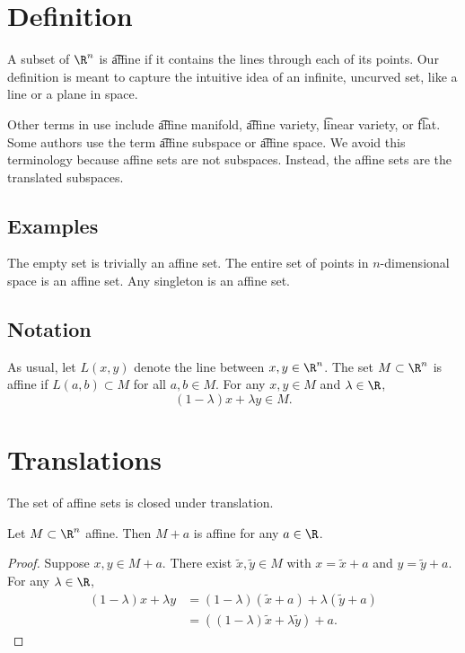
\section*{Definition}

A subset of $\R ^n$ is \t{affine} if it contains the lines through each of its points.
Our definition is meant to capture the intuitive idea of an infinite, uncurved set, like a line or a plane in space.

Other terms in use include \t{affine manifold}, \t{affine variety}, \t{linear variety}, or \t{flat}.
Some authors use the term \t{affine subspace} or \t{affine space}.
We avoid this terminology because affine sets are not subspaces.
Instead, the affine sets are the translated subspaces.

\subsection*{Examples}

The empty set is trivially an affine set.
The entire set of points in $n$-dimensional space is an affine set.
Any singleton is an affine set.

\subsection*{Notation}

As usual, let $L(x, y)$ denote the line between $x, y \in \R ^n$.
The set $M \subset \R ^n$ is affine if $L(a, b) \subset M$ for all $a, b \in M$.
For any $x, y \in M$ and $\lambda  \in \R $,
\[
(1-\lambda )x + \lambda y \in M.
\]

\section*{Translations}

The set of affine sets is closed under translation.
\begin{proposition}
Let $M \subset \R ^n$ affine.
Then $M + a$ is affine for any $a \in \R $.
\begin{proof}Suppose $x, y \in M+a$.
There exist $\tilde{x}, \tilde{y} \in M$ with $x = \tilde{x} + a$ and $y = \tilde{y} + a$.
For any $\lambda  \in \R $,
\[
\begin{aligned}
(1-\lambda )x + \lambda y & = (1-\lambda )(\tilde{x} + a) + \lambda (\tilde{y} + a) \\
&= ((1-\lambda )\tilde{x} + \lambda \tilde{y}) + a.
\end{aligned}
\]\end{proof}
\end{proposition}


